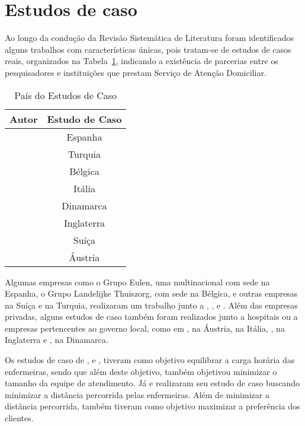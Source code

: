 \section{\esp Estudos de caso }\label{casos}

Ao longo da condução da Revisão Sistemática de Literatura foram identificados alguns trabalhos com características únicas, pois tratam-se de estudos de casos reais, organizados na Tabela~\ref{estudo}, indicando a existência de parcerias entre os pesquisadores e instituições que prestam Serviço de Atenção Domiciliar.

\begin{table}[ht]
\centering
\caption{País do Estudos de Caso}
\label{estudo}
\begin{tabular}{c|c}
\hline
\textbf{Autor}                  & \textbf{Estudo de Caso} \\ \hline
\cite{luna:2013}  	       		& Espanha      \\ \hline
\cite{tozlu:2016}          		& Turquia    \\ \hline
\cite{goos:2015}           		& Bélgica        \\ \hline
\cite{cattafi:2012}        		& Itália      \\ \hline
\cite{rasmussenm:2012}		   	& Dinamarca	   \\ \hline
\cite{drake:2007}		 	   	& Inglaterra	  \\ \hline	
\cite{nguyen:2016}         		& Suíça         \\ \hline
\cite{trautsamwieser:2014} 		& Áustria      \\ \hline
\end{tabular}
\end{table}

Algumas empresas como o Grupo Eulen, uma multinacional com sede na Espanha, o Grupo Landelijke Thuiszorg, com sede na Bélgica, e outras empresas na Suíça e na Turquia, realizaram um trabalho junto a , ,  e . 
Além das empresas privadas, alguns estudos de caso também foram realizados junto a hospitais ou a empresas pertencentes ao governo local, como em , na Áustria,  na Itália, , na Inglaterra e , na Dinamarca.

Os estudos de caso de ,  e , tiveram como objetivo equilibrar a carga horária das enfermeiras, sendo que além deste objetivo,  também objetivou minimizar o tamanho da equipe de atendimento.
Já  e  realizaram seu estudo de caso buscando minimizar a distância percorrida pelas enfermeiras. Além de minimizar a distância percorrida,  também tiveram como objetivo maximizar a preferência dos clientes.

